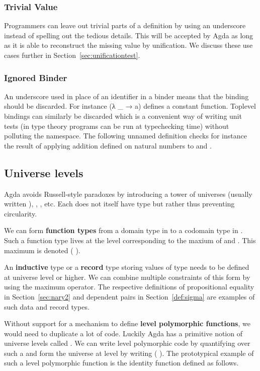 \subsubsection{Trivial Value}

Programmers can leave out trivial parts of a definition by using an underscore
instead of spelling out the tedious details. This will be accepted by Agda as
long as it is able to reconstruct the missing value by unification. We discuss
these use cases further in Section~\ref{sec:unificationtest}.

\subsubsection{Ignored Binder}

An underscore used in place of an identifier in a binder means that the binding
should be discarded. For instance {(λ \_ → a)} defines a constant function.
Toplevel bindings can similarly be discarded which is a convenient way of
writing unit tests (in type theory programs can be run at typechecking time)
without polluting the namespace. The following unnamed definition checks for
instance the result of applying addition defined on natural numbers to
 and .


\subsection{Universe levels}\label{appendix:agda:level}

Agda avoids Russell-style paradoxes by introducing a tower of universes
 (usually written ), , , etc. Each
 does not itself have type  but rather  thus
preventing circularity.

We can form {\bf function types} from a domain type in  to a codomain
type in . Such a function type lives at the level corresponding
to the maxium of  and . This maximum is denoted {(  )}.

An {\bf inductive} type or a {\bf record} type storing values of type 
needs to be defined at universe level  or higher. We can combine multiple
constraints of this form by using the maximum operator. The respective definitions
of propositional equality in Section~\ref{sec:nary2} and dependent pairs in
Section~\ref{def:sigma} are examples of such data and record types.

Without support for a mechanism to define {\bf level polymorphic functions},
we would need to duplicate a lot of code. Luckily Agda has a primitive notion
of universe levels called . We can write level polymorphic code by
quantifying over such a   and form the universe at level
 by writing ( ). The prototypical example of such a
level polymorphic function is the identity function  defined as follows.

